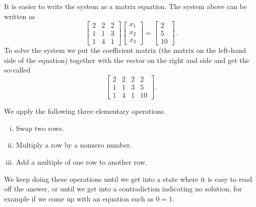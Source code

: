 It is easier to write the system as a matrix equation.
The system above can be
written as
\begin{equation*}
\begin{bmatrix}
2 & 2 & 2 \\
1 & 1 & 3 \\
1 & 4 & 1 
\end{bmatrix}
\begin{bmatrix}
x_1 \\
x_2 \\
x_3
\end{bmatrix} 
=
\begin{bmatrix}
2 \\
5 \\
10
\end{bmatrix} .
\end{equation*}
To solve the system we put the coefficient matrix (the matrix on the
left-hand side of the equation) together with the vector on the right and side
and get the
so-called
\emph{}
\begin{equation*}
\left[
\begin{array}{ccc|c}
2 & 2 & 2 & 2 \\
1 & 1 & 3 & 5 \\
1 & 4 & 1 & 10
\end{array}
\right] .
\end{equation*}

\pagebreak[2]
We apply the following three elementary operations.
\begin{enumerate}[(i)]
\item Swap two rows.
\item Multiply a row by a nonzero number.
\item Add a multiple of one row to another row.
\end{enumerate}
We keep doing these operations until we get into a state where it is
easy to read off the answer, or until we get into a contradiction indicating
no solution, for example if we come up with an equation such as $0=1$.

